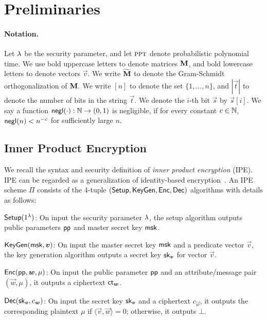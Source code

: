 \section{Preliminaries}
\paragraph{Notation.} Let $\lambda$ be the security parameter, and let $\textsc{ppt}$ denote probabilistic polynomial time. We use bold uppercase letters to denote matrices ${\bf M}$, and bold lowercase letters to denote vectors $\vec{v}$. We write $\widetilde{\mathbf{M}}$ to denote the Gram-Schmidt orthogonalization of $\mathbf{M}.$ We write $[n]$ to denote the set $\{1,...,n\}$, and $|\vec{t}|$ to denote the number of bits in the string $\vec{t}$. We denote the $i$-th bit $\vec{s}$ by $\vec{s}[i]$. We say a function $\mathsf{negl}(\cdot): \mathbb{N} \rightarrow (0,1)$ is negligible, if for every constant $c \in \mathbb{N}$, $\mathsf{negl}(n) < n^{-c}$ for sufficiently large $n$.%

\subsection{Inner Product Encryption}
We recall the syntax and security definition of \emph{inner product encryption} (IPE). IPE can be regarded as a generalization of identity-based encryption~\cite{C:Shamir84,C:BonFra01}. An IPE scheme $\Pi$ consists of the 4-tuple $(\mathsf{Setup}, \mathsf{KeyGen}, \mathsf{Enc}, \mathsf{Dec})$ algorithms with details as follows:
\begin{description}
 \item $\mathsf{Setup}(1^\lambda)$: On input the security parameter $\lambda$, the setup algorithm outputs public parameters $\mathsf{pp}$ and master secret key $\mathsf{msk}$.
 \item $\mathsf{KeyGen}(\mathsf{msk}, \boldsymbol{v})$: On input the master secret key $\mathsf{msk}$ and a predicate vector $\vec{v}$, the key generation algorithm outputs a secret key $\mathsf{sk}_{\boldsymbol{v}}$ for vector $\vec{v}$.
 \item $\mathsf{Enc}(\mathsf{pp}, \boldsymbol{w}, \mu)$: On input the public parameter $\mathsf{pp}$ and an attribute/message pair $(\vec{w}, \mu)$, it outputs a ciphertext $\mathsf{ct}_{\boldsymbol{w}}$.
 \item $\mathsf{Dec}(\mathsf{sk}_{\boldsymbol{v}}, c_{\boldsymbol{w}})$: On input the secret key $\mathsf{sk}_{\boldsymbol{v}}$ and a ciphertext $c_{\vec{w}}$, it outputs the corresponding plaintext $\mu$ if $\langle \vec{v}, \vec{w} \rangle = 0$; otherwise, it outputs $\bot$.
\end{description}

